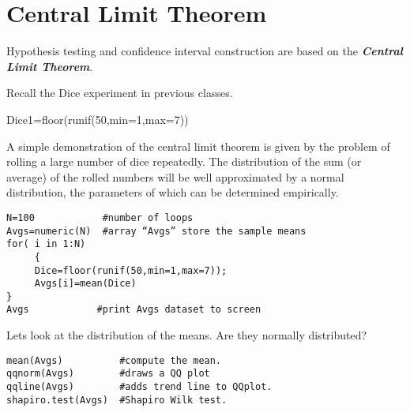 \section{Central Limit Theorem}

Hypothesis testing and confidence interval construction are based on the \textbf{\textit{Central Limit Theorem}}.

Recall the Dice experiment in previous classes.

Dice1=floor(runif(50,min=1,max=7))  

A simple demonstration of the central limit theorem is given by the problem of rolling a large number of dice repeatedly. 
The distribution of the sum (or average) of the rolled numbers will be well approximated by a normal distribution, the parameters of which can be determined empirically.
\begin{verbatim} 
N=100            #number of loops
Avgs=numeric(N)  #array “Avgs” store the sample means
for( i in 1:N)
     { 
     Dice=floor(runif(50,min=1,max=7));
     Avgs[i]=mean(Dice)  
}                                 
Avgs            #print Avgs dataset to screen
\end{verbatim}
Lets look at the distribution of the means. Are they normally distributed?

\begin{verbatim}
mean(Avgs)          #compute the mean. 
qqnorm(Avgs)        #draws a QQ plot
qqline(Avgs)        #adds trend line to QQplot.
shapiro.test(Avgs)  #Shapiro Wilk test. 
\end{verbatim}


